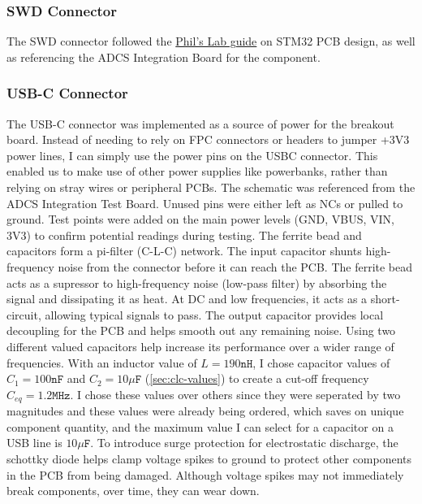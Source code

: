 \documentclass[10pt]{article}
\newcommand{\nl}{\newline \newline}
\begin{document}
\subsubsection{SWD Connector}\label{sec:schematic-tag}
The SWD connector followed the \href{https://www.youtube.com/watch?v=PMEpQZ90f34}{Phil's Lab guide} on STM32 PCB design, as well as referencing the ADCS Integration Board for the component.



\subsubsection{USB-C Connector}\label{sec:schematic-usbc}
The USB-C connector was implemented as a source of power for the breakout board. Instead of needing to rely on FPC connectors or headers to jumper +3V3 power lines, I can simply use the power pins on the USBC connector.
This enabled us to make use of other power supplies like powerbanks, rather than relying on stray wires or peripheral PCBs.
\nl
The schematic was referenced from the ADCS Integration Test Board. Unused pins were either left as NCs or pulled to ground.
Test points were added on the main power levels (GND, VBUS, VIN, 3V3) to confirm potential readings during testing.
\nl
The ferrite bead and capacitors form a pi-filter (C-L-C) network. The input capacitor shunts high-frequency noise from the connector before it can reach the PCB.
The ferrite bead acts as a supressor to high-frequency noise (low-pass filter) by absorbing the signal and dissipating it as heat. At DC and low frequencies, it acts as a short-circuit, allowing typical signals to pass.
The output capacitor provides local decoupling for the PCB and helps smooth out any remaining noise. Using two different valued capacitors help increase its performance over a wider range of frequencies.
With an inductor value of $L=190\texttt{nH}$, I chose capacitor values of $C_1=100\texttt{nF}$ and $C_2=10\mu\texttt{F}$ (\autoref{sec:clc-values}) to create a cut-off frequency $C_{eq}=1.2\texttt{MHz}$.
I chose these values over others since they were seperated by two magnitudes and these values were already being ordered, which saves on unique component quantity, and the maximum value I can select for a capacitor on a USB line is $10\mu\texttt{F}$.
\nl
To introduce surge protection for electrostatic discharge, the schottky diode helps clamp voltage spikes to ground to protect other components in the PCB from being damaged. Although voltage spikes may not immediately break components, over time, they can wear down.
\end{document}
